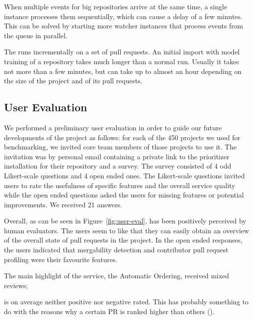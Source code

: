 \documentclass[conference]{IEEEtran}
\begin{document}
When multiple events for big repositories arrive at the same time, a single
\prioritizer instance processes them sequentially, which can cause a delay of a
few minutes. This can be solved by starting more watcher instances that
process events from the queue in parallel.

The \prioritizer runs incrementally on a set of pull requests. An initial import
with model training of a repository takes much longer than a normal run. Usually
it takes not more than a few minutes, but can take up to almost an hour
depending on the size of the project and of its pull requests.

\subsection{User Evaluation}

We performed a preliminary user evaluation in order to guide our future
developments of the project as follows: for each of the 450 projects we used for
benchmarking, we invited core team members of those projects to use it.  The
invitation was by personal email containing a private link to the prioritizer
installation for their repository and a survey. The survey consisted of 4 odd
Likert-scale questions and 4 open ended ones. The Likert-scale questions invited
users to rate the usefulness of specific features and the overall service
quality while the open ended questions asked the users for missing features or
potential improvements. We received 21 answers.

Overall, as can be seen in Figure~\ref{fig:user-eval}, \prioritizer has been
positively perceived by human evaluators. The users seem to like that they
can easily obtain an overview of the overall state of pull requests in the
project. In the open ended responses, the users indicated that mergability
detection and contributor pull request profiling were their favourite
features.


The main highlight of the service, the Automatic Ordering, received mixed
reviews; 

is on average neither positive nor negative rated.
This has probably something to do with the reasons why a certain PR is ranked higher than others ().
\end{document}
